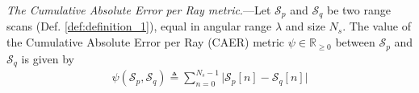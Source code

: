 \begin{definition}
  \label{def:definition_3} \textit{The Cumulative Absolute Error per Ray metric}.---Let
  $\mathcal{S}_p$ and $\mathcal{S}_q$ be two range scans (Def.
  \ref{def:definition_1}), equal in angular range $\lambda$ and size $N_s$. The
  value of the Cumulative Absolute Error per Ray (CAER) metric $\psi \in
  \mathbb{R}_{\geq 0}$ between $\mathcal{S}_p$ and $\mathcal{S}_q$ is given by
  \begin{align}
    \psi(\mathcal{S}_p,\mathcal{S}_q) \triangleq \sum\limits_{n=0}^{N_s-1} \Big| \mathcal{S}_p[n]-\mathcal{S}_q[n]\Big| \label{eq:caer}
  \end{align}
\end{definition}



